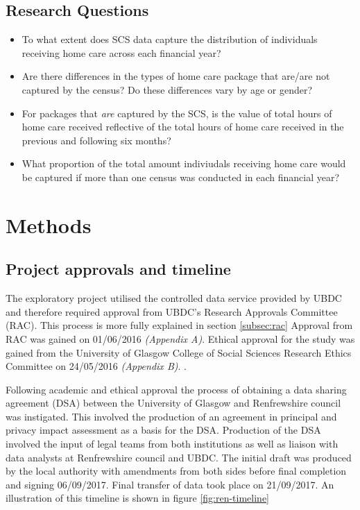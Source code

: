 \documentclass[]{article}
\begin{document}
\FloatBarrier
\subsection{Research Questions}\label{subsec:renfrew-qs}

\begin{itemize}[noitemsep]
\item To what extent does SCS data capture the distribution of individuals receiving home care across each financial year?
\item Are there differences in the types of home care package that are/are not captured by the census? Do these differences vary by age or gender?
\item For packages that \emph{are} captured by the SCS, is the value of total hours of home care received reflective of the total hours of home care received in the previous and following six months?
\item What proportion of the total amount indiviudals receiving home care would be captured if more than one census was conducted in each financial year?
\end{itemize}

\section{Methods}\label{sec:renf-methods}

\subsection{Project approvals and timeline}\label{subsec:renf-methods-approvals}

The exploratory project utilised the controlled data service provided by
UBDC and therefore required approval from UBDC's Research Approvals
Committee (RAC). This process is more fully explained in section
\ref{subsec:rac} Approval from RAC was gained on 01/06/2016
\emph{(Appendix A)}. Ethical approval for the study was gained from the
University of Glasgow College of Social Sciences Research Ethics
Committee on 24/05/2016 \emph{(Appendix B)}. .

Following academic and ethical approval the process of obtaining a data
sharing agreement (DSA) between the University of Glasgow and
Renfrewshire council was instigated. This involved the production of an
agreement in principal and privacy impact assessment as a basis for the
DSA. Production of the DSA involved the input of legal teams from both
institutions as well as liaison with data analysts at Renfrewshire
council and UBDC. The initial draft was produced by the local authority
with amendments from both sides before final completion and signing
06/09/2017. Final transfer of data took place on 21/09/2017. An
illustration of this timeline is shown in figure \ref{fig:ren-timeline}
\end{document}
